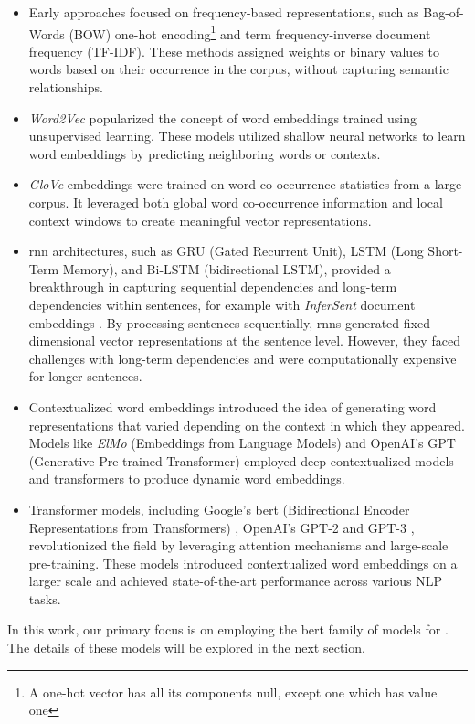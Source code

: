 \begin{itemize}
    \item Early approaches focused on frequency-based representations, such as Bag-of-Words (BOW) one-hot encoding\footnote{A one-hot vector has all its components null, except one which has value one} and term frequency-inverse document frequency (TF-IDF). These methods assigned weights or binary values to words based on their occurrence in the corpus, without capturing semantic relationships.
    \item \emph{Word2Vec}  popularized the concept of word embeddings trained using unsupervised learning. These models utilized shallow neural networks to learn word embeddings by predicting neighboring words or contexts. 
    \item \emph{GloVe} embeddings   were trained on word co-occurrence statistics from a large corpus. It leveraged both global word co-occurrence information and local context windows to create meaningful vector representations.
    \item \gls{rnn} architectures, such as GRU (Gated Recurrent Unit), LSTM (Long Short-Term Memory),  and Bi-LSTM (bidirectional LSTM), provided a breakthrough in capturing sequential dependencies and long-term dependencies within sentences, for example with \emph{InferSent} document embeddings . By processing sentences sequentially, \gls{rnn}s generated fixed-dimensional vector representations at the sentence level. However, they faced challenges with long-term dependencies and were computationally expensive for longer sentences.
    
    \item  Contextualized word embeddings introduced the idea of generating word representations that varied depending on the context in which they appeared. Models like \emph{ElMo} (Embeddings from Language Models)  and OpenAI's GPT (Generative Pre-trained Transformer)  employed deep contextualized models and transformers to produce dynamic word embeddings.
    \item Transformer models, including Google's \gls{bert} (Bidirectional Encoder Representations from Transformers) 
    , OpenAI's GPT-2  and GPT-3 , revolutionized the field by leveraging attention mechanisms and large-scale pre-training. These models introduced contextualized word embeddings on a larger scale and achieved state-of-the-art performance across various NLP tasks. %
\end{itemize}


In this work, our primary focus is on employing the \gls{bert} family of models for \textclassification{}. The details of these models will be explored in the next section.
